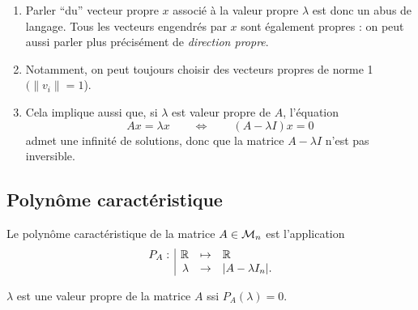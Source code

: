 \remarks
\begin{enumerate}
  \item Parler ``du'' vecteur propre $x$ associé à la valeur propre $\lambda$ est donc un abus de langage. Tous les vecteurs engendrés par $x$ sont également propres : on peut aussi parler plus précisément de {\em direction propre}. 
  \item Notamment, on peut toujours choisir des vecteurs propres de norme 1 $(\|v_i\| = 1$). 
  \item Cela implique aussi que, si $\lambda$ est valeur propre de $A$, l'équation
  $$
  Ax = \lambda x \qquad \Leftrightarrow \qquad (A - \lambda I)x = 0
  $$
  admet une infinité de solutions, donc que la matrice $A - \lambda I$ n'est pas inversible.
\end{enumerate}

\subsection{Polynôme caractéristique} \label{sec:polCarac}

\begin{definition*}
  Le polynôme caractéristique de la matrice $A \in \mathcal{M}_n$ est l'application 
  $$
  \begin{array}{r|rcl}
   P_A: & \mathbb{R} & \mapsto & \mathbb{R} \\
    & \lambda & \rightarrow & |A - \lambda I_n|.
  \end{array}
  $$
\end{definition*}

\bigskip
\begin{theorem*}
  $\lambda$ est une valeur propre de la matrice $A$ ssi $P_A(\lambda) = 0$.
\end{theorem*}

